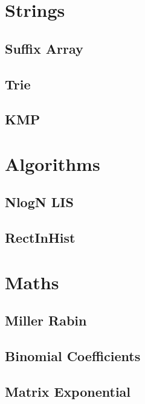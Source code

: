 \documentclass[twocolumn]{article}
\begin{document}
    \newpage
    \section{Strings}
        \subsection{Suffix Array}
        
        \subsection{Trie}
        
        \subsection{KMP}
        


    \newpage
    \section{Algorithms}
        \subsection{NlogN LIS}
        
        \subsection{RectInHist}
        

    \newpage
    \section{Maths}
        \subsection{Miller Rabin}
        
        \subsection{Binomial Coefficients}
        
        
        \subsection{Matrix Exponential}
        
\end{document}
